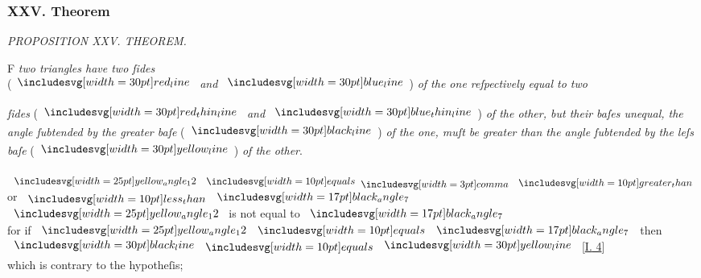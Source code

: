 \documentclass[11pt,preview]{standalone}
\begin{document}
\subsubsection{XXV. Theorem}

\begin{minipage}[t]{0.54\textwidth}
    \begin{center}
        \textit{PROPOSITION XXV. THEOREM.}\label{book1pr25} \\
    \end{center}

    \hfill

    \begin{center}
        \raggedright \lettrine[lines=3, loversize=1, nindent=0pt]{}{}F \textit{two triangles have two ſides}\\ (\hspace{-1ex}$\redline$ \textit{and} $\blueline$\hspace{-1ex}) \textit{of the one reſpectively equal to two}
    \end{center}
    \textit{ſides} (\hspace{-1ex}$\redthinline$ \textit{and} $\bluethinline$\hspace{-1ex}) \textit{of the other, but their baſes unequal, the angle ſubtended by the greater baſe} (\hspace{-1ex}$\blackline$\hspace{-1ex}) \textit{of the one, muſt be greater than the angle ſubtended by the leſs baſe} (\hspace{-1ex}$\yellowline$\hspace{-1ex}) \textit{of the other}.
\end{minipage}%
\hfill
\begin{minipage}[t]{0.43\textwidth}
    \vspace{20pt}
    
\end{minipage}


{\vspace{1ex}\begin{center}
    $\img{yellow_angle_12} \bequals \bcomma \bgt$ or $\blt \img[0][0][17]{black_angle_7}$\\
    $\img{yellow_angle_12}$ is not equal to $\img[0][0][17]{black_angle_7}$\\
    for if $\img{yellow_angle_12} \bequals \img[0][0][17]{black_angle_7}$ then $\blackline \bequals \yellowline$ [\hyperref[book1pr4]{\textsc{I.} 4}]\\
    which is contrary to the hypotheſis;
\end{center}}
\end{document}
